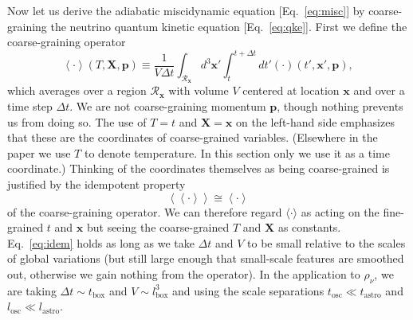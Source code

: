 \documentclass[aps,prd,twocolumn,groupedaddress,preprintnumbers]{revtex4-2}
\begin{document}
Now let us derive the adiabatic miscidynamic equation [Eq.~\eqref{eq:misc}] by coarse-graining the neutrino quantum kinetic equation [Eq.~\eqref{eq:qke}]. First we define the coarse-graining operator 
\begin{equation}
\left\langle \cdot \right\rangle (T, \boldsymbol{X}, \boldsymbol{p}) \equiv \frac{1}{V \Delta t} \int_{\mathcal{R}_{\boldsymbol{x}}} d^3\boldsymbol{x}' \int_t^{t+\Delta t} dt' \left( \cdot \right) \left( t', \boldsymbol{x}', \boldsymbol{p} \right), \label{eq:cgop}
\end{equation}
which averages over a region $\mathcal{R}_{\boldsymbol{x}}$ with volume $V$ centered at location $\boldsymbol{x}$ and over a time step $\Delta t$. We are not coarse-graining momentum $\boldsymbol{p}$, though nothing prevents us from doing so. The use of $T = t$ and $\boldsymbol{X} = \boldsymbol{x}$ on the left-hand side emphasizes that these are the coordinates of coarse-grained variables. (Elsewhere in the paper we use $T$ to denote temperature. In this section only we use it as a time coordinate.) Thinking of the coordinates themselves as being coarse-grained is justified by the idempotent property
\begin{equation}
\left\langle \left\langle \cdot \right\rangle \right\rangle \cong \left\langle \cdot \right\rangle \label{eq:idem}
\end{equation}
of the coarse-graining operator. We can therefore regard $\langle \cdot \rangle$ as acting on the fine-grained $t$ and $\boldsymbol{x}$ but seeing the coarse-grained $T$ and $\boldsymbol{X}$ as constants. Eq.~\eqref{eq:idem} holds as long as we take $\Delta t$ and $V$ to be small relative to the scales of global variations (but still large enough that small-scale features are smoothed out, otherwise we gain nothing from the operator). In the application to $\rho_\nu$, we are taking $\Delta t \sim t_\textrm{box}$ and $V \sim l_\textrm{box}^3$ and using the scale separations $t_\textrm{osc} \ll t_\textrm{astro}$ and $l_\textrm{osc} \ll l_\textrm{astro}$.
\end{document}

